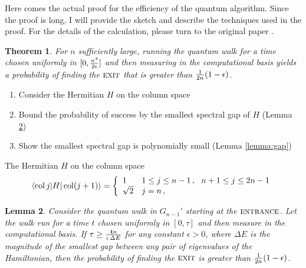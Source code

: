 \documentclass[aps,11pt,twoside,nofootinbib,tightenlines,superscriptaddress,preprintnumbers]{revtex4}
\makeatletter
\newcommand{\<}{\langle}
\renewcommand{\>}{\rangle}
\newcommand{\be}{\begin{equation}}
\newcommand{\ee}{\end{equation}}
\newcommand{\cond}[1]{\left\{\begin{array}{l@{~~~}l}#1\end{array}\right.}
\newcommand{\ent}{{\textsc{entrance}}}
\newcommand{\exit}{{\textsc{exit}}}
\newcommand{\col}{\mathop{\mathrm{col}}\nolimits}
\newtheorem{theorem}{Theorem}
\newtheorem{lemma}[theorem]{Lemma}
\newenvironment{proof sketch}
{\trivlist\item\noindent{\bf Proof sketch}~}
{\qed\endtrivlist}
\makeatother
\begin{document}
Here comes the actual proof for the efficiency of the quantum algorithm. Since the proof is long, I will provide the sketch and describe the techniques used in the proof. For the details of the calculation, please turn to the original paper \cite{EXP03}.


\begin{theorem}
For $n$ sufficiently large, running the quantum walk for a time chosen
uniformly in $[0,{n^4 \over 2\epsilon}]$ and then measuring in the
computational basis yields a probability of finding the $\exit$ that is
greater than ${1 \over 2n} (1-\epsilon)$.
\label{thm:hitting}
\end{theorem}

\begin{proof sketch}

\begin{enumerate}
    \item Consider the Hermitian $H$ on the column space
    \item Bound the probability of success by the smallest spectral gap of $H$ (Lemma \ref{lemma:hitting})
    \item Show the smallest spectral gap is polynomially small (Lemma \ref{lemma:gap})
\end{enumerate}

The Hermitian $H$ on the column space
\be
  \<\col j|H|\col(j+1)\> = \cond{
   1      & 1 \le j \le n-1 \,,~~ n+1 \le j \le 2n-1 \\
   \sqrt2 & j=n \,,}
\ee

\end{proof sketch}


\begin{lemma}\label{lemma:hitting}
Consider the quantum walk in $G_{n-1}'$ starting at the $\ent$.  Let the
walk run for a time $t$ chosen uniformly in $[0,\tau]$ and then measure in
the computational basis.  If $\tau \ge {4n \over \epsilon \, \Delta E}$
for any constant $\epsilon>0$, where $\Delta E$ is the magnitude of the
smallest gap between any pair of eigenvalues of the Hamiltonian, then the
probability of finding the $\exit$ is greater than ${1 \over
2n}(1-\epsilon)$.
\end{lemma}
\end{document}

